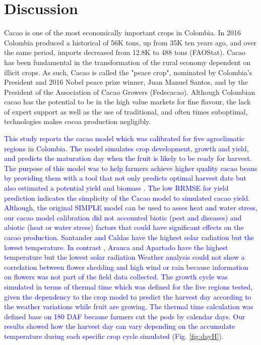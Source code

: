 \documentclass[gene,journal,article,submit,moreauthors,pdftex]{Definitions/mdpi}
\begin{document}
\section{Discussion}


Cacao is one of the most economically important crops in Colombia. In 2016 Colombia produced a historical of 56K tons, up from 35K ten years ago, and over the same period, imports decreased from 12.8K to 488 tons (FAOStat). Cacao has been fundamental in the transformation of the rural economy dependent on illicit crops. As such, Cacao is called the "peace crop", nominated by  Colombia's President and 2016 Nobel peace prize winner, Juan Manuel Santos, and by the President of the Association of Cacao Growers (Fedecacao). Although Colombian cacao has the potential to be in the high value markets for fine flavour, the lack of expert support as well as the use of traditional, and often times suboptimal, technologies makes cocoa production negligibly. 

\textcolor{blue}{This study reports the cacao model which was calibrated for five agroclimatic regions in Colombia. The model simulates crop development, growth and yield, and predicts the maturation day when the fruit is likely to be ready for harvest.  The purpose of this model was to help farmers achieve  higher quality cacao beans by providing them with a tool that not only predicts optimal harvest date but also estimated a potential yield and biomass . The low RRMSE for yield prediction indicates the simplicity of the Cacao model to simulated cacao  yield. Although, the original SIMPLE model can be used to asses heat and water stress, our cacao model calibration  did  not accounted biotic (pest and diseases) and abiotic (heat or water stress) factors that could have significant effects on the cacao production.  Santander and Caldas have the  highest solar radiation but the lowest temperature. In contrast , Arauca and Apartado have the  highest temperature but the lowest solar radiation
Weather analysis could not show a correlation between flower shedding and high wind or rain because information on flowers was not part of the field data collected. 	The growth cycle was simulated in terms of thermal time which was defined for the five regions tested, given the dependency to the crop model to predict the harvest day according to the weather variations while fruit are growing.  The thermal time calculation was defined base on  180 DAF because farmers cut the pods by calendar days. Our results showed how the harvest day can vary depending on the accumulate temperature during each specific crop cycle simulated (Fig. \ref{fig:dayH}).
}
\end{document}
